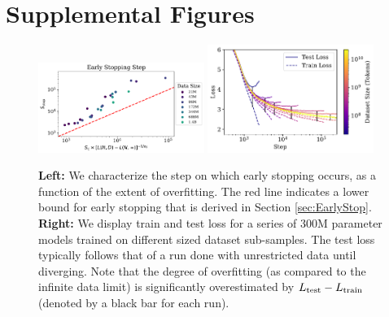 \documentclass[english]{article}
\begin{document}
\section{Supplemental  Figures}

 \begin{figure}
\noindent \centering{} 
\includegraphics[width=0.48\textwidth]{EarlyStoppingvsNandD}\hfill
\includegraphics[width=0.48\textwidth]{TrainVsTestMedium}
\caption[Early stopping lower bound and training curves for overfit models]{ {\bf Left:}  We characterize the step on which early stopping occurs, as a function of the extent of overfitting.  The red line indicates a {lower bound} for early stopping that is derived in Section \ref{sec:EarlyStop}.  {\bf Right:} We display train and test loss for a series of 300M parameter models trained on different sized dataset sub-samples.  The test loss typically follows that of a run done with unrestricted data until diverging. Note that the degree of overfitting (as compared to the infinite data limit) is significantly overestimated by $L_{\rm test} - L_{\rm train}$ (denoted by a black bar for each run). \label{fig:OverfittingandEarlyStopping}}
\end{figure}
\end{document}
